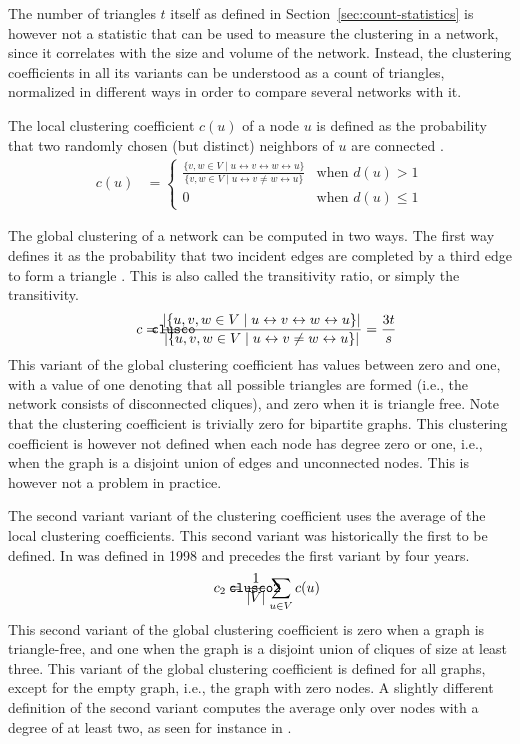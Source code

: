 \documentclass{article}
\def\mathnote#1{%
  \tag*{\rlap{\hspace\marginparsep\smash{\parbox[t]{\marginparwidth}{#1}}}}
}
\begin{document}
The number of triangles $t$ itself as defined in
Section~\ref{sec:count-statistics} is however not a statistic that can
be used to measure the clustering in a network, since it correlates with
the size and volume of the network.  Instead, the clustering
coefficients in all its variants can be understood as a count of
triangles, normalized in different ways in order to compare several
networks with it.

The local clustering coefficient $c(u)$ of a node $u$ is defined as the
probability that two randomly chosen (but distinct) neighbors of $u$ are
connected \citep{b228}.
\begin{align}
  c(u) &= \left\{ \begin{array}{ll} \frac { \{ v, w \in V \mid u \leftrightarrow v
      \leftrightarrow w \leftrightarrow u \} } { \{ v, w \in V \mid u \leftrightarrow v \neq w \leftrightarrow u \}
    } & \text{when } d(u) > 1 \\ 0 & \text{when } d(u) \leq 1
          \end{array} \right. 
\end{align}

The global clustering of a network can be computed in two ways.  The
first way defines it as the probability that two incident edges are
completed by a third edge to form a triangle \citep{b736}. This is also
called the transitivity ratio, or simply the transitivity.
\begin{align}
  \mathnote{\texttt{clusco}} c &= 
  \frac {|\{ u, v, w \in V \mid u \leftrightarrow v \leftrightarrow w \leftrightarrow u \}|} 
        {|\{ u, v, w \in V \mid u \leftrightarrow v \neq w \leftrightarrow u \}|} 
        = \frac {3t} s
\end{align}
This variant of the global clustering coefficient has values between
zero and one, with a value of one denoting that all possible triangles
are formed (i.e., the network consists of disconnected cliques), and
zero when it is triangle free.  Note that the clustering coefficient is
trivially zero for bipartite graphs.  This clustering coefficient is
however not defined when each node has degree zero or one, i.e., when
the graph is a disjoint union of edges and unconnected nodes.  This is
however not a problem in practice.

The second variant variant of the clustering coefficient uses the
average of the local clustering coefficients. This second variant was
historically the first to be defined.  In was defined in
1998 \citep{b228} and precedes the first variant by four years.
\begin{align}
  \mathnote{\texttt{clusco2}} c_2 &= \frac 1 {|V|} \sum_{u \in V} c(u)
\end{align}
This second variant of the global clustering coefficient is zero when a
graph is triangle-free, and one when the graph is a disjoint union of
cliques of size at least three.  This variant of the global clustering
coefficient is defined for all graphs, except for the empty graph, i.e.,
the graph with zero nodes.  A slightly different definition of the
second variant computes the average only over nodes with a degree of at
least two, as seen for instance in \citep{b845}.
\end{document}
